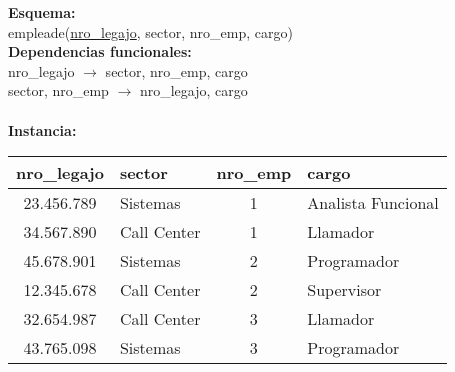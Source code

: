 \documentclass[preview]{standalone}
\begin{document}
\textbf{Esquema:}\\
empleade(\underline{nro\_legajo}, sector, nro\_emp, cargo)\\

\textbf{Dependencias funcionales:}\\
nro\_legajo $\rightarrow$ sector, nro\_emp, cargo\\
sector, nro\_emp $\rightarrow$ nro\_legajo, cargo\\
{\color{red}{cargo $\rightarrow$ sector}}\\

\textbf{Instancia:}
\begin{center}
\scriptsize
\begin{tabular}{| c | l | c | l |}\hline			
	nro\_legajo & sector & nro\_emp & cargo  \\\hline			
	23.456.789 & Sistemas & 1 & Analista Funcional \\
	34.567.890 & Call Center & 1 & Llamador \\
	45.678.901 & Sistemas & 2 & Programador \\
	12.345.678 & Call Center & 2 & Supervisor \\
	32.654.987 & Call Center & 3 & Llamador \\
	43.765.098 & Sistemas & 3 & Programador \\\hline
\end{tabular}
\end{center}
\end{document}
